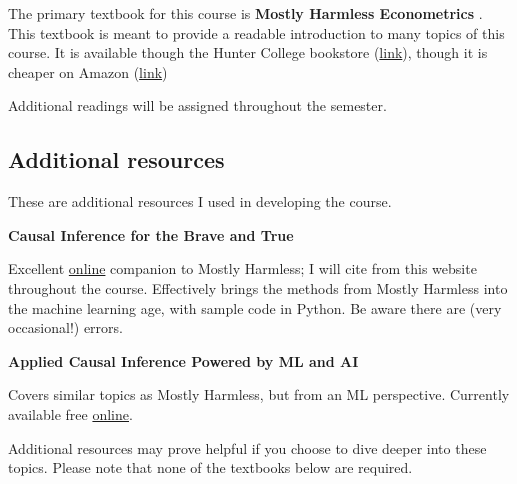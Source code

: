 \documentclass[11 pt]{article}
\begin{document}
The primary textbook for this course is \textbf{Mostly Harmless Econometrics} \parencite{AP09}.
This textbook is meant to provide a readable introduction to many topics of this course. 
It is available though the Hunter College bookstore (\href{https://hunter.textbookx.com/institutional/index.php?action=browse#books/4891202/}{link}), though it is cheaper on Amazon (\href{https://www.amazon.com/Mostly-Harmless-Econometrics-Empiricists-Companion/dp/0691120358/ref=sr_1_1?adgrpid=1227055302933586&dib=eyJ2IjoiMSJ9.miIdw25tOmutaXlv500au4xpviIV3geiWQ_DkyRWKJlEws_8EbzeALEGY_-R7BVVY4kDLyV4neIHMrn8qoYBZvb50DTyuPCO8Vn9VF7WzQDWcas0n5FLu5mBvQFaS-7tw2CqO66FDgnGH-ZRWn09LA.hynR_nkYtrHiYr2_l6nk-n5IzHjRQduC6oNkpeWgvqE&dib_tag=se&hvadid=76691122015644&hvbmt=be&hvdev=c&hvlocphy=97793&hvnetw=s&hvqmt=e&hvtargid=kwd-76691206557062%3Aloc-190&hydadcr=22160_13439067&keywords=mostly+harmless+econometrics&mcid=48817c499db83be19176cdf4dc4fc94f&msclkid=2f5b328c5b4c1a5f8d885a2f16a5ef4c&qid=1755532783&sr=8-1}{link})


Additional readings will be assigned throughout the semester.

\subsection*{Additional resources}

These are additional resources I used in developing the course. 

\textbf{Causal Inference for the Brave and True}
\parencite{A22} 
\begin{blist}
\item Excellent \href{https://matheusfacure.github.io/python-causality-handbook/landing-page.html}{online} companion to Mostly Harmless; I will cite from this website throughout the course. Effectively brings the methods from Mostly Harmless into the machine learning age, with sample code in Python. Be aware there are (very occasional!) errors.
\end{blist}

\textbf{Applied Causal Inference Powered by ML and AI}
\parencite{CHKSS25}
\begin{blist}
\item Covers similar topics as Mostly Harmless, but from an ML perspective. Currently available free \href{https://causalml-book.org/}{online}. 
\end{blist}


Additional resources may prove helpful if you choose to dive deeper into these topics. 
Please note that none of the textbooks below are required.
\end{document}

